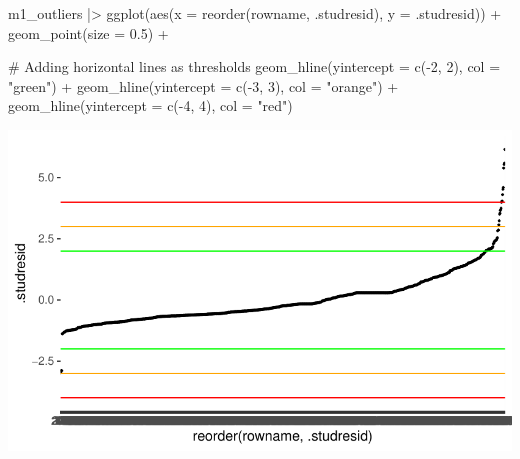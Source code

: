 \documentclass[
  letterpaper,
  DIV=11,
  numbers=noendperiod]{scrreprt}
\newenvironment{Shaded}{\begin{snugshade}}{\end{snugshade}}
\newcommand{\AttributeTok}[1]{\textcolor[rgb]{0.40,0.45,0.13}{#1}}
\newcommand{\CommentTok}[1]{\textcolor[rgb]{0.37,0.37,0.37}{#1}}
\newcommand{\DecValTok}[1]{\textcolor[rgb]{0.68,0.00,0.00}{#1}}
\newcommand{\FloatTok}[1]{\textcolor[rgb]{0.68,0.00,0.00}{#1}}
\newcommand{\FunctionTok}[1]{\textcolor[rgb]{0.28,0.35,0.67}{#1}}
\newcommand{\NormalTok}[1]{\textcolor[rgb]{0.00,0.23,0.31}{#1}}
\newcommand{\SpecialCharTok}[1]{\textcolor[rgb]{0.37,0.37,0.37}{#1}}
\newcommand{\StringTok}[1]{\textcolor[rgb]{0.13,0.47,0.30}{#1}}
\begin{document}
\begin{Shaded}
\begin{Highlighting}[]
\NormalTok{m1\_outliers }\SpecialCharTok{|\textgreater{}}
  \FunctionTok{ggplot}\NormalTok{(}\FunctionTok{aes}\NormalTok{(}\AttributeTok{x =} \FunctionTok{reorder}\NormalTok{(rowname, .studresid),}
             \AttributeTok{y =}\NormalTok{ .studresid)) }\SpecialCharTok{+}
  \FunctionTok{geom\_point}\NormalTok{(}\AttributeTok{size =} \FloatTok{0.5}\NormalTok{) }\SpecialCharTok{+}
  
  \CommentTok{\# Adding horizontal lines as thresholds}
  \FunctionTok{geom\_hline}\NormalTok{(}\AttributeTok{yintercept =} \FunctionTok{c}\NormalTok{(}\SpecialCharTok{{-}}\DecValTok{2}\NormalTok{, }\DecValTok{2}\NormalTok{), }\AttributeTok{col =} \StringTok{"green"}\NormalTok{) }\SpecialCharTok{+}
  \FunctionTok{geom\_hline}\NormalTok{(}\AttributeTok{yintercept =} \FunctionTok{c}\NormalTok{(}\SpecialCharTok{{-}}\DecValTok{3}\NormalTok{, }\DecValTok{3}\NormalTok{), }\AttributeTok{col =} \StringTok{"orange"}\NormalTok{) }\SpecialCharTok{+}
  \FunctionTok{geom\_hline}\NormalTok{(}\AttributeTok{yintercept =} \FunctionTok{c}\NormalTok{(}\SpecialCharTok{{-}}\DecValTok{4}\NormalTok{, }\DecValTok{4}\NormalTok{), }\AttributeTok{col =} \StringTok{"red"}\NormalTok{)}
\end{Highlighting}
\end{Shaded}

\includegraphics{13_regressions_files/figure-latex/plot-outliers-ext-stud-resid-1.pdf}
\end{document}
